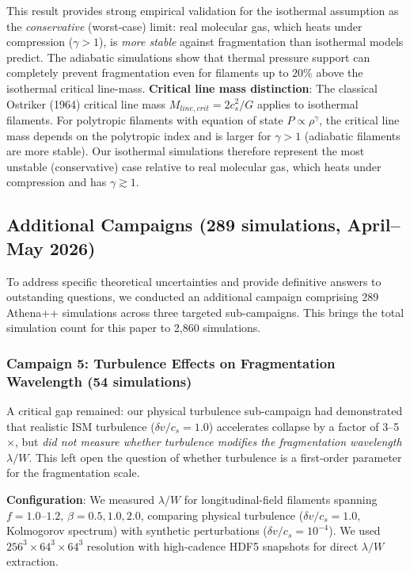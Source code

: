 \documentclass[twocolumn]{mnras}
\begin{document}
This result provides strong empirical validation for the isothermal assumption as the {\it conservative} (worst-case) limit: real molecular gas, which heats under compression ($\gamma > 1$), is {\it more stable} against fragmentation than isothermal models predict. The adiabatic simulations show that thermal pressure support can completely prevent fragmentation even for filaments up to $20\%$ above the isothermal critical line-mass. \textbf{Critical line mass distinction}: The classical Ostriker (1964) critical line mass $M_{line,crit} = 2c_s^2/G$ applies to isothermal filaments. For polytropic filaments with equation of state $P \propto \rho^\gamma$, the critical line mass depends on the polytropic index and is larger for $\gamma > 1$ (adiabatic filaments are more stable). Our isothermal simulations therefore represent the most unstable (conservative) case relative to real molecular gas, which heats under compression and has $\gamma \gtrsim 1$.

\subsection{Additional Campaigns (289 simulations, April--May 2026)}
\label{sec:additional_campaigns}

To address specific theoretical uncertainties and provide definitive answers to outstanding questions, we conducted an additional campaign comprising 289 Athena++ simulations across three targeted sub-campaigns. This brings the total simulation count for this paper to 2,860 simulations.

\subsubsection{Campaign 5: Turbulence Effects on Fragmentation Wavelength (54 simulations)}

A critical gap remained: our physical turbulence sub-campaign had demonstrated that realistic ISM turbulence ($\delta v/c_s = 1.0$) accelerates collapse by a factor of 3--5$\times$, but \textit{did not measure whether turbulence modifies the fragmentation wavelength $\lambda/W$}. This left open the question of whether turbulence is a first-order parameter for the fragmentation scale.

\textbf{Configuration}: We measured $\lambda/W$ for longitudinal-field filaments spanning $f = 1.0$--$1.2$, $\beta = 0.5, 1.0, 2.0$, comparing physical turbulence ($\delta v/c_s = 1.0$, Kolmogorov spectrum) with synthetic perturbations ($\delta v/c_s = 10^{-4}$). We used $256^3 \times 64^3 \times 64^3$ resolution with high-cadence HDF5 snapshots for direct $\lambda/W$ extraction.
\end{document}

